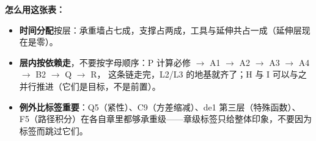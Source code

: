 \textbf{怎么用这张表：}
\begin{itemize}
  \item \textbf{时间分配}按层：承重墙占七成，支撑占两成，工具与延伸共占一成（延伸层现在是零）。
  \item \textbf{层内按依赖走}，不要按字母顺序：P 计算必修 $\to$ A1 $\to$ A2 $\to$ A3 $\to$ A4 $\to$ B2 $\to$ Q $\to$ R，
        这条链走完，L2/L3 的地基就齐了；H 与 I 可以与之并行推进（它们是目标，不是前置）。
  \item \textbf{例外比标签重要}：Q5（紧性）、C9（方差缩减）、de1 第三层（特殊函数）、
        F5（路径积分）在各自章里都够承重级——章级标签只给整体印象，不要因为标签而跳过它们。
\end{itemize}